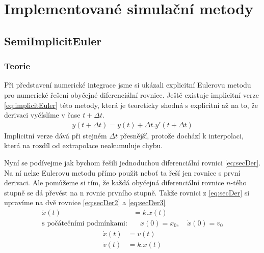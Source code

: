 \chapter{Implementované simulační metody}
\section{SemiImplicitEuler}
\label{sec:implEuler}
\subsection{Teorie}
Při představení numerické integrace jsme si ukázali explicitní Eulerovu metodu pro numerické řešení obyčejné diferenciální rovnice. Ještě existuje implicitní verze \eqref{eq:implicitEuler} této metody, která je teoreticky shodná s explicitní až na to, že derivaci vyčíslíme v čase $t + \Delta t $.
\begin{align} \label{eq:implicitEuler}
y(t+\Delta t) = y(t) + \Delta t . y'(t+\Delta t)
\end{align}
Implicitní verze dává při stejném $ \Delta t $ přesnější, protože dochází k interpolaci, která na rozdíl od extrapolace neakumuluje chybu.

Nyní se podívejme jak bychom řešili jednoduchou diferenciální rovnici \eqref{eq:secDer}. Na ní nelze Eulerovu metodu přímo použít neboť ta řeší jen rovnice s první derivaci. Ale pomůžeme si tím, že každá obyčejná diferenciální rovnice $ n $-tého stupně se dá převést na n rovnic prvního stupně. Takže rovnici z \eqref{eq:secDer} si upravíme na dvě rovnice \eqref{eq:secDer2} a \eqref{eq:secDer3}
\begin{align} \label{eq:secDer}
\ddot{x}(t) &= k.x(t) \quad \\
\text{s počátečními podmínkami:}& \quad x(0)=x_0, \quad \dot{x}(0)=v_0\nonumber
\end{align}
\begin{subequations}
	\label{eq:secDer23}
	\begin{align}
	\label{eq:secDer2}
	\dot x(t)&= v(t) \\
	\label{eq:secDer3}
	\dot v(t)&=k.x(t)
	\end{align}
\end{subequations}

